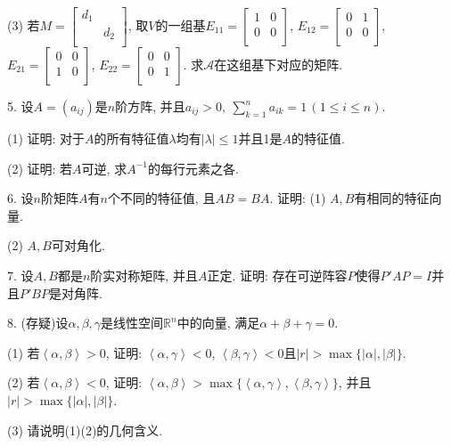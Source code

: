 \documentclass[12pt, a4paper, twoside]{ctexart}%
\begin{document}
{	\hspace{1.2em}(3) 若$M=\begin{bmatrix}
		d_1& \\
		&d_2\\
	\end{bmatrix}$, 取$V$的一组基$E_{11}=\begin{bmatrix}
	1&0 \\
	0&0\\
	\end{bmatrix}$, $E_{12}=\begin{bmatrix}
	0&1 \\
	0&0\\
	\end{bmatrix}$, $E_{21}=\begin{bmatrix}
	0&0 \\
	1&0\\
	\end{bmatrix}$, $E_{22}=\begin{bmatrix}
	0&0 \\
	0&1\\
	\end{bmatrix}$. 求$\mathscr{A}$在这组基下对应的矩阵.\par
	5. 设$A=(a_{ij})$是$n$阶方阵, 并且$a_{ij}>0,\ \sum\limits_{k=1}^n a_{ik}=1\,(1\leq i\leq n)$.\par 
	\hspace{1.2em}(1) 证明: 对于$A$的所有特征值$\lambda$均有$\left|\lambda\right|\leq1$并且1是$A$的特征值.\par
	\hspace{1.2em}(2) 证明: 若$A$可逆, 求$A^{-1}$的每行元素之各.\par
	6. 设$n$阶矩阵$A$有$n$个不同的特征值, 且$AB=BA$. 证明: 
	\hspace{1.2em}(1) $A,B$有相同的特征向量. \par
	\hspace{1.2em}(2) $A,B$可对角化. \par
	7. 设$A,B$都是$n$阶实对称矩阵, 并且$A$正定. 证明: 存在可逆阵容$P$使得$P'AP=I$并且$P'BP$是对角阵. \par
	8. (存疑)设$\alpha,\beta,\gamma$是线性空间$\mathbb{R}^n$中的向量, 满足$\alpha+\beta+\gamma=0$. \par
	\hspace{1.2em}(1) 若$\left\langle\alpha,\beta\right\rangle>0$, 证明: $\left<\alpha,\gamma\right><0$, $\left<\beta,\gamma\right><0$且$|r|>\max\{|\alpha|,|\beta|\}$.\par 
	\hspace{1.2em}(2) 若$\left\langle\alpha,\beta\right\rangle<0$, 证明: $\left<\alpha,\beta\right>>\max\{\left<\alpha,\gamma\right>,\left<\beta,\gamma\right>\}$, 并且$|r|>\max\{|\alpha|,|\beta|\}$.\par 
	\hspace{1.2em}(3) 请说明(1)(2)的几何含义.\par
	
}
\end{document}
